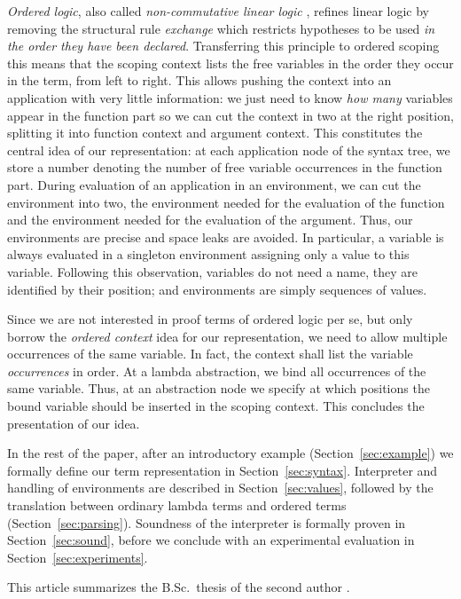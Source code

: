 \documentclass[submission,copyright,creativecommons]{eptcs}
\begin{document}
\emph{Ordered logic}, also called \emph{non-commutative linear logic}
\cite{polakowPfenning:tlca99}, refines linear logic by removing the
structural rule \emph{exchange} which restricts hypotheses to be used
\emph{in the order they have been declared}.  Transferring this
principle to ordered scoping this means that the scoping context lists
the free variables in the order they occur in the term, from left to
right.  This allows pushing the context into an application with very
little information: we just need to know \emph{how many} variables
appear in the function part so we can cut the context in two at the
right position, splitting it into function context and argument
context.  This constitutes the central idea of our representation: at
each application node of the syntax tree, we store a number denoting
the number of free variable occurrences in the function part.  During
evaluation of an application in an environment, we can cut the
environment into two, the environment needed for the evaluation of the
function and the environment needed for the evaluation of the
argument.  Thus, our environments are precise and space leaks are
avoided.  In particular, a variable is always evaluated in a singleton
environment assigning only a value to this variable.  Following this
observation, variables do not need a name, they are identified by
their position; and environments are simply sequences of values.

Since we are not interested in proof terms of ordered logic per se,
but only borrow the \emph{ordered context} idea for our
representation, we need to allow multiple occurrences of the same
variable.  In fact, the context shall list the variable
\emph{occurrences} in order.  At a lambda abstraction, we bind all
occurrences of the same variable.  Thus, at an abstraction node we
specify at which positions the bound variable should be inserted in
the scoping context.  This concludes the presentation of our idea.  

In the rest of the paper, after an introductory example
(Section~\ref{sec:example}) we formally define our term representation
in Section~\ref{sec:syntax}.   Interpreter and handling of
environments are described in Section~\ref{sec:values}, followed by
the translation between ordinary lambda terms and ordered terms
(Section~\ref{sec:parsing}).  Soundness of the interpreter is formally
proven in Section~\ref{sec:sound}, before we conclude with an
experimental evaluation in Section~\ref{sec:experiments}.

This article summarizes the B.Sc.\ thesis of the second author
\cite{kraus:bachelor}.
\end{document}
